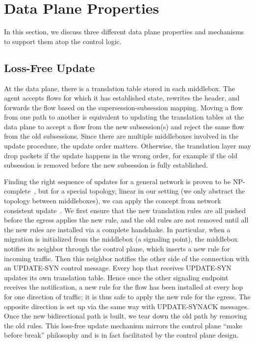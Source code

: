 
\section{Data Plane Properties}
In this section, we discuss three different data plane properties and mechanisms to support them atop the control logic.

\subsection{Loss-Free Update}


At the data plane, there is a translation table stored in each middlebox. The \system agent accepts flows for which it has established state, rewrites the header, and forwards the flow based on the supersession-subsession mapping. Moving a flow from one path to another is equivalent to updating the translation tables at the data plane to accept a flow from the new subsession(s) and reject the same flow from the old subsessions. Since there are multiple middleboxes involved in the update procedure, the update order matters. Otherwise, the translation layer may drop packets if the update happens in the wrong order, for example if the old subsession is removed before the new subsession is fully established.


Finding the right sequence of updates for a general network is proven to be NP-complete~\cite{SWAN, zUpdate}, but for a special topology, linear in our setting (we only abstract the topology between middleboxes), we can apply the concept from network consistent update~\cite{consistentupdate, ratul}. We first ensure that the new translation rules are all pushed before the egress applies the new rule, and the old rules are not removed until all the new rules are installed via a complete handshake. In particular, when a migration is initialized from the middlebox (a signaling point), the middlebox notifies its neighbor through the control plane, which inserts a new rule for incoming traffic. Then this neighbor notifies the other side of the connection with an UPDATE-SYN control message. Every hop that receives UPDATE-SYN updates its own translation table. Hence once the other signaling endpoint receives the notification, a new rule for the flow has been installed at every hop for one direction of traffic; it is thus safe to apply the new rule for the egress. The opposite direction is set up via the same way with UPDATE-SYNACK messages. Once the new bidirectional path is built, we tear down the old path by removing the old rules. This loss-free update mechanism mirrors the control plane ``make before break'' philosophy and is in fact facilitated by the control plane design. 

